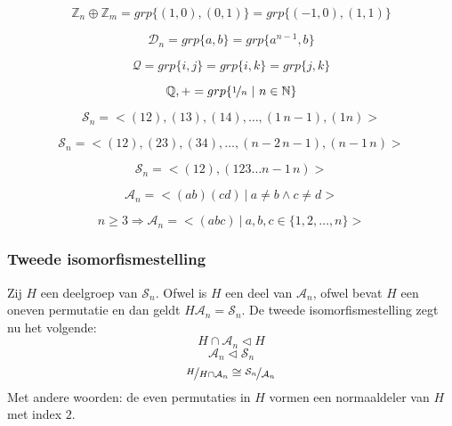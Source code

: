 \documentclass[main.tex]{subfiles}
\begin{document}
\begin{vb}
  \[ \mathbb{Z}_{n} \oplus \mathbb{Z}_{m} = grp\{(1,0),(0,1)\} = grp\{(-1,0),(1,1)\} \]
\end{vb}

\begin{vb}
  \[ \mathcal{D}_{n} = grp\{a,b\} = grp\{ a^{n-1},b \} \]
\end{vb}

\begin{vb}
  \[ \mathcal{Q} = grp\{ i,j\} = grp\{ i,k \} = grp\{ j,k\} \]
\end{vb}

\begin{vb}
  \[ \mathbb{Q},+ = grp\{ \nicefrac{1}{n} \ |\ n \in \mathbb{N}\} \]
\end{vb}

\begin{vb}
  \[ \mathcal{S}_n = <(12),(13),(14),\dotsc, (1\, n-1), (1n)> \]
\end{vb}

\begin{vb}
  \[ \mathcal{S}_n = <(12),(23),(34),\dotsc, (n-2\, n-1), (n-1\,n)> \]
\end{vb}

\begin{vb}
  \[ \mathcal{S}_n = <(12), (123\dotsc n-1\,n)> \]
\end{vb}

\begin{vb}
  \[ \mathcal{A}_n = <(ab)(cd)\ |\ a\neq b \wedge c \neq d> \]
\end{vb}

\begin{vb}
  \[ n \ge 3 \Rightarrow \mathcal{A}_n = <(abc)\ |\ a,b,c \in \{1,2,\dotsc,n\}> \]
\end{vb}

\subsubsection{Tweede isomorfismestelling}

\begin{vb}
  Zij $H$ een deelgroep van $\mathcal{S}_{n}$.
  Ofwel is $H$ een deel van $\mathcal{A}_{n}$, ofwel bevat $H$ een oneven permutatie en dan geldt $H\mathcal{A}_{n} = \mathcal{S}_{n}$.
  De tweede isomorfismestelling zegt nu het volgende:
  \[ H \cap \mathcal{A}_{n} \triangleleft H \]
  \[ \mathcal{A}_{n} \triangleleft \mathcal{S}_{n} \]
  \[ \nicefrac{H}{H\cap \mathcal{A}_{n}} \cong \nicefrac{\mathcal{S}_{n}}{\mathcal{A}_{n}} \]
  Met andere woorden: de even permutaties in $H$ vormen een normaaldeler van $H$ met index $2$.
\end{vb}
\end{document}
